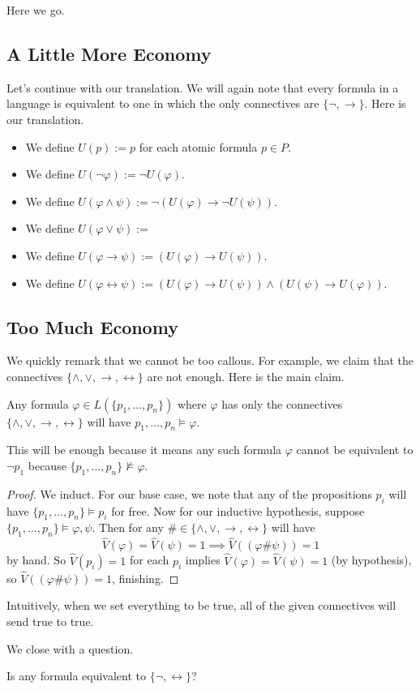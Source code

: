 
Here we go.

\subsection{A Little More Economy}
Let's continue with our translation. We will again note that every formula in a language is equivalent to one in which the only connectives are $\{\lnot,\to\}$. Here is our translation.
\begin{itemize}
	\item We define $U(p):=p$ for each atomic formula $p\in P$.
	\item We define $U(\lnot\varphi):=\lnot U(\varphi)$.
	\item We define $U(\varphi\land\psi):=\lnot(U(\varphi)\to\lnot U(\psi))$.
	\item We define $U(\varphi\lor\psi):=$
	\item We define $U(\varphi\to\psi):=(U(\varphi)\to U(\psi))$.
	\item We define $U(\varphi\leftrightarrow\psi):=(U(\varphi)\to U(\psi))\land(U(\psi)\to U(\varphi))$.
\end{itemize}

\subsection{Too Much Economy}
We quickly remark that we cannot be too callous. For example, we claim that the connectives $\{\land,\lor,\to,\leftrightarrow\}$ are not enough. Here is the main claim.
\begin{lemma}
	Any formula $\varphi\in L(\{p_1,\ldots,p_n\})$ where $\varphi$ has only the connectives $\{\land,\lor,\to,\leftrightarrow\}$ will have $p_1,\ldots,p_n\models\varphi$.
\end{lemma}
This will be enough because it means any such formula $\varphi$ cannot be equivalent to $\lnot p_1$ because $\{p_1,\ldots,p_n\}\nvDash\varphi$.
\begin{proof}
	We induct. For our base case, we note that any of the propositions $p_i$ will have $\{p_1,\ldots,p_n\}\models p_i$ for free. Now for our inductive hypothesis, suppose $\{p_1,\ldots,p_n\}\models\varphi,\psi$. Then for any $\#\in\{\land,\lor,\to,\leftrightarrow\}$ will have
	\[\hat V(\varphi)=\hat V(\psi)=1\implies\hat V((\varphi\#\psi))=1\]
	by hand. So $\hat V(p_i)=1$ for each $p_i$ implies $\hat V(\varphi)=\hat V(\psi)=1$ (by hypothesis), so $\hat V((\varphi\#\psi))=1$, finishing.
\end{proof}
\begin{remark}
	Intuitively, when we set everything to be true, all of the given connectives will send true to true.
\end{remark}
We close with a question.
\begin{ques}
	Is any formula equivalent to $\{\lnot,\leftrightarrow\}$?
\end{ques}

